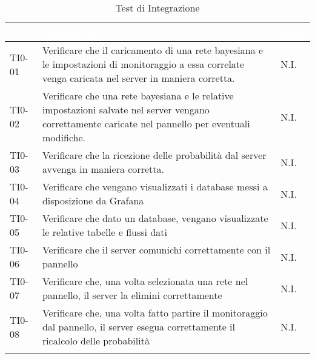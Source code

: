 \begin{longtable}{|C{.15\textwidth}|m{.52\textwidth}|m{.08\textwidth}|}
\hline
{}\textbf{\textcolor{white}{Test}} & \textbf{\textcolor{white}{Descrizione}} & \textbf{\textcolor{white}{Esito}}\\
\hline \hline
\endhead

TI0-01 & Verificare che il caricamento di una rete bayesiana e le impostazioni di monitoraggio a essa correlate venga caricata nel server in maniera corretta. & N.I. \\
\hline
{} TI0-02 & Verificare che una rete bayesiana e le relative impostazioni salvate nel server vengano correttamente caricate nel pannello per eventuali modifiche. & N.I. \\
\hline
TI0-03 & Verificare che la ricezione delle probabilità dal server avvenga in maniera corretta. & N.I. \\
\hline
{} TI0-04 & Verificare che vengano visualizzati i database messi a disposizione da Grafana & N.I. \\
\hline
TI0-05 & Verificare che dato un database, vengano visualizzate le relative tabelle e flussi dati & N.I. \\
\hline
{}TI0-06 & Verificare che il server comunichi correttamente con il pannello & N.I. \\
\hline
TI0-07 & Verificare che, una volta selezionata una rete nel pannello, il server la elimini correttamente & N.I. \\
\hline 
{}TI0-08 & Verificare che, una volta fatto partire il monitoraggio dal pannello, il server esegua correttamente il ricalcolo delle probabilità & N.I. \\  
\hline

\caption{Test di Integrazione}
\label{testintegrazione}
\end{longtable}